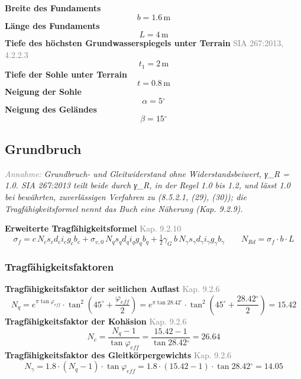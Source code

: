 \documentclass[11pt,a4paper]{article}
\newcommand{\normref}[1]{{\small\textcolor{gray}{#1}}}
\newcommand{\hinweis}[2]{\par\noindent\textcolor{gray}{\textit{#1:}} \textit{#2}\par}
\begin{document}
\noindent\textbf{Breite des Fundaments}
\begin{equation*}
b = 1.6\,\mathrm{m}
\end{equation*}
\noindent\textbf{Länge des Fundaments}
\begin{equation*}
L = 4\,\mathrm{m}
\end{equation*}
\noindent\textbf{Tiefe des höchsten Grundwasserspiegels unter Terrain} \hfill \normref{SIA 267:2013, 4.2.2.3}
\begin{equation*}
t_1 = 2\,\mathrm{m}
\end{equation*}
\noindent\textbf{Tiefe der Sohle unter Terrain}
\begin{equation*}
t = 0.8\,\mathrm{m}
\end{equation*}
\noindent\textbf{Neigung der Sohle}
\begin{equation*}
\alpha = 5{}^{\circ}
\end{equation*}
\noindent\textbf{Neigung des Geländes}
\begin{equation*}
\beta = 15{}^{\circ}
\end{equation*}
\subsection{Grundbruch}
\hinweis{Annahme}{Grundbruch- und Gleitwiderstand ohne Widerstandsbeiwert, γ\_R = 1.0. SIA 267:2013 teilt beide durch γ\_R, in der Regel 1.0 bis 1.2, und lässt 1.0 bei bewährten, zuverlässigen Verfahren zu (8.5.2.1, (29), (30)); die Tragfähigkeitsformel nennt das Buch eine Näherung (Kap. 9.2.9).}
\noindent\textbf{Erweiterte Tragfähigkeitsformel} \hfill \normref{Kap. 9.2.10}
\begin{equation*}
\sigma_f = c \, N_c s_c d_c i_c g_c b_c + \sigma_{v,0} \, N_q s_q d_q i_q g_q b_q + \tfrac{1}{2} \gamma_G \, b \, N_{\gamma} s_{\gamma} d_{\gamma} i_{\gamma} g_{\gamma} b_{\gamma} \qquad N_{Rd} = \sigma_f \cdot b \cdot L
\end{equation*}
\subsubsection{Tragfähigkeitsfaktoren}
\noindent\textbf{Tragfähigkeitsfaktor der seitlichen Auflast} \hfill \normref{Kap. 9.2.6}
\begin{equation*}
N_q = e^{\pi \tan \varphi_{eff}} \cdot \tan^{2}\left(45^\circ + \frac{\varphi_{eff}}{2}\right) = e^{\pi \tan 28.42{}^{\circ}} \cdot \tan^{2}\left(45^\circ + \frac{28.42{}^{\circ}}{2}\right) = 15.42
\end{equation*}
\noindent\textbf{Tragfähigkeitsfaktor der Kohäsion} \hfill \normref{Kap. 9.2.6}
\begin{equation*}
N_c = \frac{N_q - 1}{\tan \varphi_{eff}} = \frac{15.42 - 1}{\tan 28.42{}^{\circ}} = 26.64
\end{equation*}
\noindent\textbf{Tragfähigkeitsfaktor des Gleitkörpergewichts} \hfill \normref{Kap. 9.2.6}
\begin{equation*}
N_{\gamma} = 1.8 \cdot \left(N_q - 1\right) \cdot \tan \varphi_{eff} = 1.8 \cdot \left(15.42 - 1\right) \cdot \tan 28.42{}^{\circ} = 14.05
\end{equation*}
\end{document}
